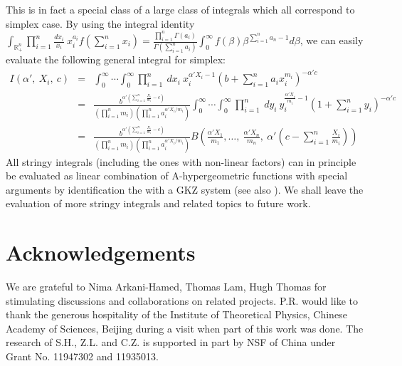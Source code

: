 \documentclass[hidelinks,12pt]{article}
\newcommand{\bea}[1]{\begin{eqnarray}\label{#1} }
\newcommand{\eea}{\end{eqnarray}}
\def\bea{\begin{eqnarray}}
\def\eea{\end{eqnarray}}
\begin{document}
This is in fact a special class of a large class of integrals which all correspond to simplex case. By using the integral identity $\int_{{\mathbb R_{+}^{n}}} \prod_{i=1}^{n} \frac{d x_i }{x_i}~x_i^{a_i}  f\left(\sum_{i=1}^{n} x_i \right)   = \frac{\prod_{i=1}^n \Gamma{(a_i)}}{\Gamma{(\sum_{i=1}^n a_i)}} \int_{0}^{\infty} f(\beta) \beta^{\sum_{i=1}^{n} a_n -1} d\beta$, we can easily evaluate the following general integral for simplex:
\bea
I(\alpha',~X_i,~c ) &=&  \int_{0}^{\infty} \cdots \int_{0}^{\infty} \prod_{i=1}^{n} ~dx_i ~x_i^{\alpha' X_i -1}  \left( b+\sum_{i=1}^n a_i x_i^{m_i} \right)^{-\alpha' c } \nonumber  \\
&=& \frac{b^{\alpha' \left(\sum_{i=1}^n \frac{X_i}{m_i}-c \right) }}{(\prod_{i=1}^n m_i) (\prod_{i=1}^n a_i^{\alpha' X_i /m_i})} \int_{0}^{\infty} \cdots \int_{0}^{\infty} \prod_{i=1}^{n} ~dy_i ~y_i^{ \frac{\alpha' X_i}{m_i} -1}  \left( 1+\sum_{i=1}^n y_i \right)^{-\alpha' c } \nonumber  \\
&=&\frac{b^{\alpha' \left(\sum_{i=1}^n \frac{X_i}{m_i}-c \right) }}{(\prod_{i=1}^n m_i) (\prod_{i=1}^n a_i^{\alpha' X_i /m_i})} B\left(\frac{ \alpha' X_1}{m_1},\dots,~\frac{ \alpha' X_n}{m_n}, ~ \alpha' \left(c- \sum_{i=1}^n \frac{X_i}{m_i} \right) \right) \nonumber \eea
All stringy integrals (including the ones with non-linear factors) can in principle be evaluated as linear combination of A-hypergeometric functions with special arguments by identification the with a GKZ system \cite{saito2013grobner,gelfand1990generalized} (see also \cite{delaCruz:2019skx}). We shall leave the evaluation of more stringy integrals and related topics to future work.


\section*{ Acknowledgements}
We are grateful to Nima Arkani-Hamed, Thomas Lam, Hugh Thomas for stimulating discussions and collaborations on related projects. P.R. would like to thank the generous hospitality of the Institute of Theoretical Physics, Chinese Academy of Sciences, Beijing during a visit when part of this work was done. The research of S.H., Z.L. and C.Z. is supported in part by NSF of China under Grant No. 11947302 and 11935013. 
\end{document}
